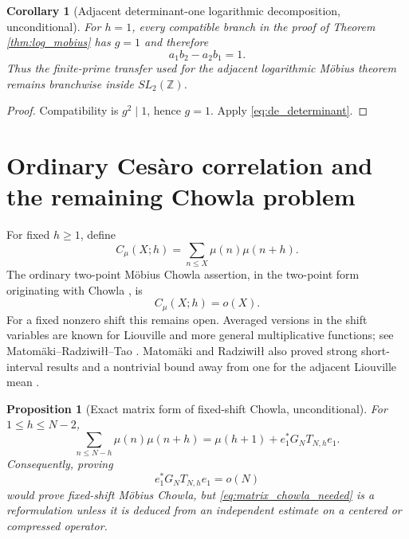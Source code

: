 \documentclass[11pt]{amsart}
\numberwithin{equation}{section}
\theoremstyle{plain}
\newtheorem{proposition}[theorem]{Proposition}
\newtheorem{corollary}[theorem]{Corollary}
\theoremstyle{definition}
\theoremstyle{remark}
\newcommand{\Z}{\mathbb Z}
\newcommand{\mob}{\mu}
\begin{document}
\begin{corollary}[Adjacent determinant-one logarithmic decomposition, unconditional]
\label{cor:adjacent_SL2_log}
For $h=1$, every compatible branch in the proof of Theorem \ref{thm:log_mobius} has $g=1$ and therefore
\begin{equation}
a_1b_2-a_2b_1=1.
\label{eq:adjacent_branch_SL2}
\end{equation}
Thus the finite-prime transfer used for the adjacent logarithmic Möbius theorem remains branchwise inside $SL_2(\Z)$.
\end{corollary}

\begin{proof}
Compatibility is $g^2\mid1$, hence $g=1$.  Apply \eqref{eq:de_determinant}.
\end{proof}

\section{Ordinary Cesàro correlation and the remaining Chowla problem}
\label{sec:cesaro_chowla}

For fixed $h\ge1$, define
\begin{equation}
C_\mob(X;h)=\sum_{n\le X}\mob(n)\mob(n+h).
\label{eq:mu_cesaro_correlation}
\end{equation}
The ordinary two-point Möbius Chowla assertion, in the two-point form originating with Chowla \cite{Chowla1965}, is
\begin{equation}
C_\mob(X;h)=o(X).
\label{eq:mu_chowla_target}
\end{equation}
For a fixed nonzero shift this remains open.  Averaged versions in the shift variables are known for Liouville and more general multiplicative functions; see Matomäki--Radziwiłł--Tao \cite{MRT2015}.  Matomäki and Radziwiłł also proved strong short-interval results and a nontrivial bound away from one for the adjacent Liouville mean \cite{MatomakiRadziwill2016}.

\begin{proposition}[Exact matrix form of fixed-shift Chowla, unconditional]
\label{prop:matrix_chowla}
For $1\le h\le N-2$,
\begin{equation}
\sum_{n\le N-h}\mob(n)\mob(n+h)
=\mob(h+1)+e_1^*G_NT_{N,h}e_1.
\label{eq:matrix_chowla_exact}
\end{equation}
Consequently, proving
\begin{equation}
e_1^*G_NT_{N,h}e_1=o(N)
\label{eq:matrix_chowla_needed}
\end{equation}
would prove fixed-shift Möbius Chowla, but \eqref{eq:matrix_chowla_needed} is a reformulation unless it is deduced from an independent estimate on a centered or compressed operator.
\end{proposition}
\end{document}
